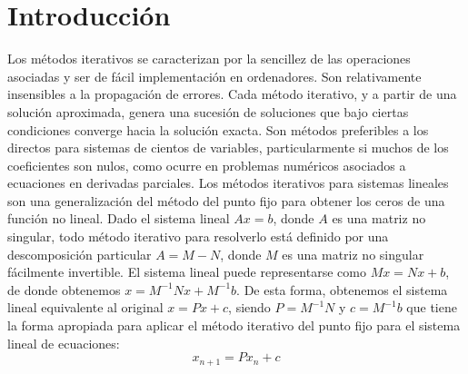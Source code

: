 \documentclass[12pt]{article}
\begin{document}
		\section*{\centering Introducción}\label{sec:Introducción}
			Los métodos iterativos se caracterizan por la sencillez de las operaciones asociadas y ser de fácil 
			implementación en ordenadores. Son relativamente insensibles a la propagación de errores. Cada 
			método iterativo, y a partir de una solución aproximada, genera una sucesión de soluciones que bajo 
			ciertas condiciones converge hacia la solución exacta. Son métodos preferibles a los directos para 
			sistemas de cientos de variables, particularmente si muchos de los coeficientes son nulos, como 
			ocurre en problemas numéricos asociados a ecuaciones en derivadas parciales. 
			Los métodos iterativos para sistemas lineales son una generalización del método del punto fijo para 
			obtener los ceros de una función no lineal. Dado el sistema lineal $ Ax = b $, donde $ A $ es una 
			matriz no singular, todo método iterativo para resolverlo está definido por una descomposición 
			particular $ A = M - N $, donde $ M $ es una matriz no singular fácilmente invertible. El sistema 
			lineal puede representarse como $ Mx = Nx + b $, de donde obtenemos $ x = M^{-1}Nx + M^{-1}b $. 
			De esta forma, obtenemos el sistema lineal equivalente al original $ x = Px + c $, siendo 
			$ P = M^{-1}N $ y $ c = M^{-1}b $ que tiene la forma apropiada para aplicar el método iterativo del
			punto fijo para el sistema lineal de ecuaciones: $$ x_{n+1} = Px_n + c $$ \cite{bib:item1}
\end{document}
